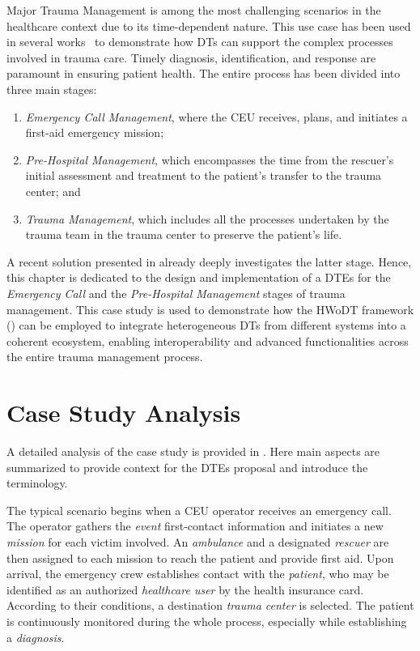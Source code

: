 Major Trauma Management is among the most challenging scenarios in the healthcare context due to its time-dependent nature.
%
This use case has been used in several works~\cite{web-of-dt-ricci-2022,Croatti_Gabellini_Montagna_Ricci_2020,Montagna2019} to demonstrate how \acp{DT} can support the complex processes involved in trauma care.
%
Timely diagnosis, identification, and response are paramount in ensuring patient health. The entire process has been divided into three main stages:
\begin{enumerate}
    \item \emph{Emergency Call Management}, where the \ac{CEU} receives, plans, and initiates a first-aid emergency mission;
    \item \emph{Pre-Hospital Management}, which encompasses the time from the rescuer's initial assessment and treatment to the patient's transfer to the trauma center; and
    \item \emph{Trauma Management}, which includes all the processes undertaken by the trauma team in the trauma center to preserve the patient's life.
\end{enumerate}
%
A recent solution presented in \cite{Montagna2019} already deeply investigates the latter stage. 
Hence, this chapter is dedicated to the design and implementation of a \acp{DTE} for the \emph{Emergency Call} and the \emph{Pre-Hospital Management} stages of trauma management.
%
This case study is used to demonstrate how the \ac{HWoDT} framework () can be employed to integrate heterogeneous \acp{DT} from different systems into a coherent ecosystem, enabling interoperability and advanced functionalities across the entire trauma management process.


\section{Case Study Analysis}

A detailed analysis of the case study is provided in \cite{web-of-dt-ricci-2022}.
%
Here main aspects are summarized to provide context for the \acp{DTE} proposal and introduce the terminology. 

The typical scenario begins when a \ac{CEU} operator receives an emergency call.
The operator gathers the \emph{event} first-contact information and initiates a new \emph{mission} for each victim involved.
An \emph{ambulance} and a designated \emph{rescuer} are then assigned to each mission to reach the patient and provide first aid.
%
Upon arrival, the emergency crew establishes contact with the \emph{patient}, who may be identified as an authorized \emph{healthcare user} by the health insurance card. According to their conditions, a destination \emph{trauma center} is selected. The patient is continuously monitored during the whole process, especially while establishing a \emph{diagnosis}.

